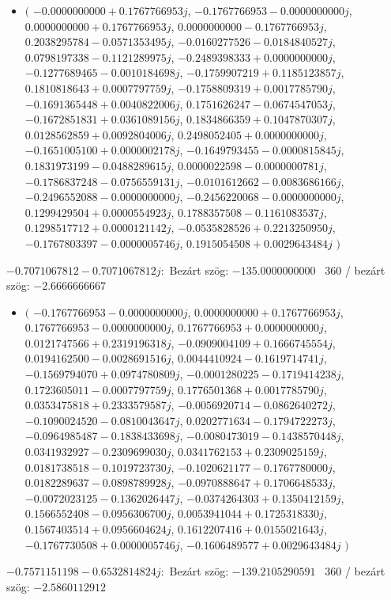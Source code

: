 \documentclass[14pt,a4paper]{article}
\begin{document}
\begin{itemize}
\item
$\big($
$-0.0000000000+0.1767766953j$, $-0.1767766953-0.0000000000j$, $0.0000000000+0.1767766953j$, $0.0000000000-0.1767766953j$, $0.2038295784-0.0571353495j$, $-0.0160277526-0.0184840527j$, $0.0798197338-0.1121289975j$, $-0.2489398333+0.0000000000j$, $-0.1277689465-0.0010184698j$, $-0.1759907219+0.1185123857j$, $0.1810818643+0.0007797759j$, $-0.1758809319+0.0017785790j$, $-0.1691365448+0.0040822006j$, $0.1751626247-0.0674547053j$, $-0.1672851831+0.0361089156j$, $0.1834866359+0.1047870307j$, $0.0128562859+0.0092804006j$, $0.2498052405+0.0000000000j$, $-0.1651005100+0.0000002178j$, $-0.1649793455-0.0000815845j$, $0.1831973199-0.0488289615j$, $0.0000022598-0.0000000781j$, $-0.1786837248-0.0756559131j$, $-0.0101612662-0.0083686166j$, $-0.2496552088-0.0000000000j$, $-0.2456220068-0.0000000000j$, $0.1299429504+0.0000554923j$, $0.1788357508-0.1161083537j$, $0.1298517712+0.0000121142j$, $-0.0535828526+0.2213250950j$, $-0.1767803397-0.0000005746j$, $0.1915054508+0.0029643484j$
$\big)$
\end{itemize}
$-0.7071067812-0.7071067812j$:\
Bezárt szög: $-135.0000000000$ \
360 / bezárt szög: $-2.6666666667$\
\begin{itemize}
\item
$\big($
$-0.1767766953-0.0000000000j$, $0.0000000000+0.1767766953j$, $0.1767766953-0.0000000000j$, $0.1767766953+0.0000000000j$, $0.0121747566+0.2319196318j$, $-0.0909004109+0.1666745554j$, $0.0194162500-0.0028691516j$, $0.0044410924-0.1619714741j$, $-0.1569794070+0.0974780809j$, $-0.0001280225-0.1719414238j$, $0.1723605011-0.0007797759j$, $0.1776501368+0.0017785790j$, $0.0353475818+0.2333579587j$, $-0.0056920714-0.0862640272j$, $-0.1090024520-0.0810043647j$, $0.0202771634-0.1794722273j$, $-0.0964985487-0.1838433698j$, $-0.0080473019-0.1438570448j$, $0.0341932927-0.2309699030j$, $0.0341762153+0.2309025159j$, $0.0181738518-0.1019723730j$, $-0.1020621177-0.1767780000j$, $0.0182289637-0.0898789928j$, $-0.0970888647+0.1706648533j$, $-0.0072023125-0.1362026447j$, $-0.0374264303+0.1350412159j$, $0.1566552408-0.0956306700j$, $0.0053941044+0.1725318330j$, $0.1567403514+0.0956604624j$, $0.1612207416+0.0155021643j$, $-0.1767730508+0.0000005746j$, $-0.1606489577+0.0029643484j$
$\big)$
\end{itemize}
$-0.7571151198-0.6532814824j$:\
Bezárt szög: $-139.2105290591$ \
360 / bezárt szög: $-2.5860112912$\
\end{document}
